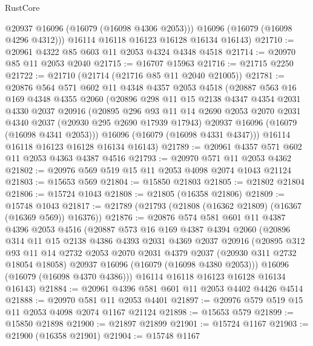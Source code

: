 \begin{lexlean}{RustCore}
\begin{coremodule}
          @20937
          @16096
          (@16079 (@16098 @4306 @2053)))
        @16096
        (@16079 (@16098 @4296 @4312)))
      @16114
      @16118
      @16123
      @16128
      @16134
      @16143)
@21710 := @20961 @4322 @85 @603 @11 @2053 @4324 @4348 @4518
@21714 := @20970 @85 @11 @2053 @2040
@21715 := @16707 @15963
@21716 := @21715 @2250
@21722 := @21710 (@21714 (@21716 @85 @11 @2040 @21005))
@21781 := @20876
    @564
    @571
    @602
    @11
    @4348
    @4357
    @2053
    @4518
    (@20887
      @563
      @16
      @169
      @4348
      @4355
      @2060
      (@20896
        @298
        @11
        @15
        @2138
        @4347
        @4354
        @2031
        @4330
        @2037
        @20916
        (@20895
          @296
          @93
          @11
          @14
          @2690
          @2053
          @2070
          @2031
          @4340
          @2037
          (@20930 @295 @2690 @17939 @17943)
          @20937
          @16096
          (@16079 (@16098 @4341 @2053)))
        @16096
        (@16079 (@16098 @4331 @4347)))
      @16114
      @16118
      @16123
      @16128
      @16134
      @16143)
@21789 := @20961 @4357 @571 @602 @11 @2053 @4363 @4387 @4516
@21793 := @20970 @571 @11 @2053 @4362
@21802 := @20976 @569 @519 @15 @11 @2053 @4098 @2074 @1043 @21124
@21803 := @15653 @569
@21804 := @15850 @21803
@21805 := @21802 @21804
@21806 := @15724 @1043
@21808 := @21805 (@16358 @21806)
@21809 := @15748 @1043
@21817 := @21789 (@21793 (@21808 (@16362 @21809) (@16367 (@16369 @569)) @16376))
@21876 := @20876
    @574
    @581
    @601
    @11
    @4387
    @4396
    @2053
    @4516
    (@20887
      @573
      @16
      @169
      @4387
      @4394
      @2060
      (@20896
        @314
        @11
        @15
        @2138
        @4386
        @4393
        @2031
        @4369
        @2037
        @20916
        (@20895
          @312
          @93
          @11
          @14
          @2732
          @2053
          @2070
          @2031
          @4379
          @2037
          (@20930 @311 @2732 @18054 @18058)
          @20937
          @16096
          (@16079 (@16098 @4380 @2053)))
        @16096
        (@16079 (@16098 @4370 @4386)))
      @16114
      @16118
      @16123
      @16128
      @16134
      @16143)
@21884 := @20961 @4396 @581 @601 @11 @2053 @4402 @4426 @4514
@21888 := @20970 @581 @11 @2053 @4401
@21897 := @20976 @579 @519 @15 @11 @2053 @4098 @2074 @1167 @21124
@21898 := @15653 @579
@21899 := @15850 @21898
@21900 := @21897 @21899
@21901 := @15724 @1167
@21903 := @21900 (@16358 @21901)
@21904 := @15748 @1167

\end{coremodule}
\end{lexlean}
